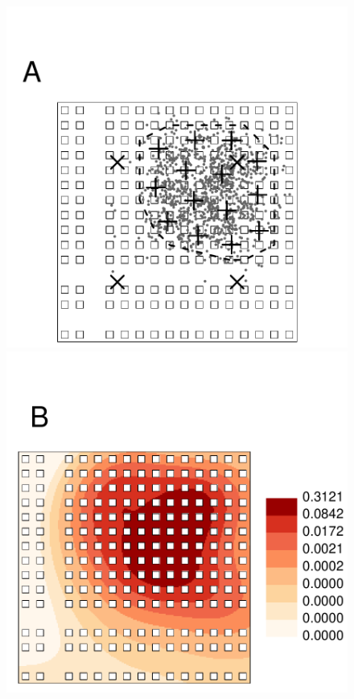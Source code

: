 \documentclass[12pt, titlepage]{article}\usepackage[]{graphicx}\usepackage[]{color}
\makeatletter
\def\maxwidth{ %
  \ifdim\Gin@nat@width>\linewidth
    \linewidth
  \else
    \Gin@nat@width
  \fi
}
\makeatother
\begin{document}
	\begin{figure}[H]
	\begin{center}
	\includegraphics[width = .50\maxwidth]{figure/simulationExample} \\
	\includegraphics[width = .50\maxwidth]{figure/simulationPlotsFittedSurface}

\end{center}
\end{figure}
\end{document}
